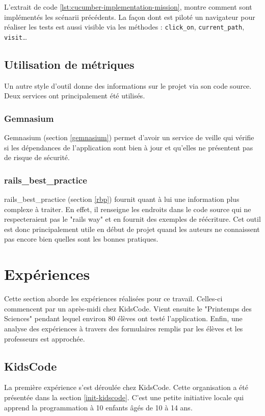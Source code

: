 L'extrait de code \ref{lst:cucumber-implementation-mission}, montre comment sont implémentés les scénarii précédents. La façon dont est piloté un navigateur pour réaliser les tests est aussi visible via les méthodes : \texttt{click\_on}, \texttt{current\_path}, \texttt{visit}\ldots

\subsection{Utilisation de métriques}
Un autre style d'outil donne des informations sur le projet via son code source. Deux services ont principalement été utilisés.

\subsubsection{Gemnasium}
Gemnasium (section \ref{gemnasium}) permet d'avoir un service de veille qui vérifie si les dépendances de l'application sont bien à jour et qu'elles ne présentent pas de risque de sécurité.

\subsubsection{rails\_best\_practice}
rails\_best\_practice (section \ref{rbp}) fournit quant à lui une information plus complexe à traiter. En effet, il renseigne les endroits dans le code source qui ne respecteraient pas le "rails way" et en fournit des exemples de réécriture. Cet outil est donc principalement utile en début de projet quand les auteurs ne connaissent pas encore bien quelles sont les bonnes pratiques.

\section{Expériences}
Cette section aborde les expériences réalisées pour ce travail. Celles-ci commencent par un après-midi chez KidsCode. Vient ensuite le "Printemps des Sciences" pendant lequel environ 80 élèves ont testé l'application. Enfin, une analyse des expériences à travers des formulaires remplis par les élèves et les professeurs est approchée.

\subsection{KidsCode}
\label{kidscode}
La première expérience s'est déroulée chez KidsCode. Cette organisation a été présentée dans la section \ref{init-kidscode}. C'est une petite initiative locale qui apprend la programmation à 10 enfants âgés de 10 à 14 ans.

